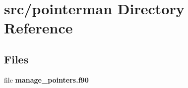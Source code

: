 \section{src/pointerman Directory Reference}
\label{dir_3545f0ca63376adbb8567db86ca976a9}
\subsection*{Files}
\begin{DoxyCompactItemize}
\item 
file {\bf manage\+\_\+pointers.\+f90}
\end{DoxyCompactItemize}
